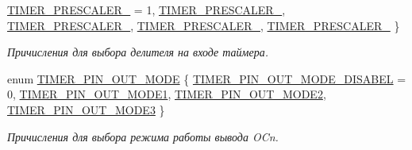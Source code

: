 \begin{DoxyCompactItemize}
\mbox{\hyperlink{group__timer_counter_gga7e6cbe0bc6f3395283c560bdc0690447a1ec6299e655a2c66b52e3b66e25e325f}{T\+I\+M\+E\+R\+\_\+\+P\+R\+E\+S\+C\+A\+L\+E\+R\+\_}} = 1, 
\mbox{\hyperlink{group__timer_counter_gga7e6cbe0bc6f3395283c560bdc0690447a9b3628a81a43f086a561c2c29653a7aa}{T\+I\+M\+E\+R\+\_\+\+P\+R\+E\+S\+C\+A\+L\+E\+R\+\_}}, 
\mbox{\hyperlink{group__timer_counter_gga7e6cbe0bc6f3395283c560bdc0690447aae816965a1b2d96c77a50c4aa9078e2b}{T\+I\+M\+E\+R\+\_\+\+P\+R\+E\+S\+C\+A\+L\+E\+R\+\_}}, 
\mbox{\hyperlink{group__timer_counter_gga7e6cbe0bc6f3395283c560bdc0690447ae875fb53e0b6a6a93793449b8b44eece}{T\+I\+M\+E\+R\+\_\+\+P\+R\+E\+S\+C\+A\+L\+E\+R\+\_}}, 
\newline
\mbox{\hyperlink{group__timer_counter_gga7e6cbe0bc6f3395283c560bdc0690447a7929d9e16a8ad961303b1a4c029a13fe}{T\+I\+M\+E\+R\+\_\+\+P\+R\+E\+S\+C\+A\+L\+E\+R\+\_}}
 \}
\begin{DoxyCompactList}\small\item\em Причисления для выбора делителя на входе таймера. \end{DoxyCompactList}\item 
enum \mbox{\hyperlink{group__timer_counter_ga57a44f196c24e7284b9a836a60359532}{T\+I\+M\+E\+R\+\_\+\+P\+I\+N\+\_\+\+O\+U\+T\+\_\+\+M\+O\+DE}} \{ \mbox{\hyperlink{group__timer_counter_gga57a44f196c24e7284b9a836a60359532a74862424bd90befcccdae23d32d67b1c}{T\+I\+M\+E\+R\+\_\+\+P\+I\+N\+\_\+\+O\+U\+T\+\_\+\+M\+O\+D\+E\+\_\+\+D\+I\+S\+A\+B\+EL}} = 0, 
\mbox{\hyperlink{group__timer_counter_gga57a44f196c24e7284b9a836a60359532af2ee5fd011fe5e6e1d5e6fbcff4f04ab}{T\+I\+M\+E\+R\+\_\+\+P\+I\+N\+\_\+\+O\+U\+T\+\_\+\+M\+O\+D\+E1}}, 
\mbox{\hyperlink{group__timer_counter_gga57a44f196c24e7284b9a836a60359532a3a74a87ac5b05d0b417dc96b8a398dfa}{T\+I\+M\+E\+R\+\_\+\+P\+I\+N\+\_\+\+O\+U\+T\+\_\+\+M\+O\+D\+E2}}, 
\mbox{\hyperlink{group__timer_counter_gga57a44f196c24e7284b9a836a60359532a82902bdaeb9c61b05edadc165d327993}{T\+I\+M\+E\+R\+\_\+\+P\+I\+N\+\_\+\+O\+U\+T\+\_\+\+M\+O\+D\+E3}}
 \}
\begin{DoxyCompactList}\small\item\em Причисления для выбора режима работы вывода O\+Cn. \end{DoxyCompactList}\end{DoxyCompactItemize}
